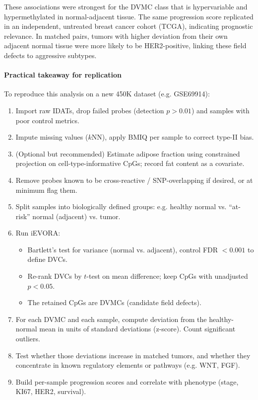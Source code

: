 \documentclass[10pt]{extarticle}
\begin{document}
These associations were strongest for the DVMC class that is hypervariable and hypermethylated in normal-adjacent tissue. The same progression score replicated in an independent, untreated breast cancer cohort (TCGA), indicating prognostic relevance. In matched pairs, tumors with higher deviation from their own adjacent normal tissue were more likely to be HER2-positive, linking these field defects to aggressive subtypes.

\paragraph{Practical takeaway for replication}
To reproduce this analysis on a new 450K dataset (e.g. GSE69914): 
\begin{enumerate}
  \item Import raw IDATs, drop failed probes (detection $p>0.01$) and samples with poor control metrics.
  \item Impute missing values ($k$NN), apply BMIQ per sample to correct type-II bias.
  \item (Optional but recommended) Estimate adipose fraction using constrained projection on cell-type-informative CpGs; record fat content as a covariate.
  \item Remove probes known to be cross-reactive / SNP-overlapping if desired, or at minimum flag them.
  \item Split samples into biologically defined groups: e.g. healthy normal vs. “at-risk” normal (adjacent) vs. tumor.
  \item Run iEVORA: 
    \begin{itemize}[label=-]
      \item Bartlett’s test for variance (normal vs. adjacent), control FDR $<0.001$ to define DVCs.
      \item Re-rank DVCs by $t$-test on mean difference; keep CpGs with unadjusted $p<0.05$.
      \item The retained CpGs are DVMCs (candidate field defects).
    \end{itemize}
  \item For each DVMC and each sample, compute deviation from the healthy-normal mean in units of standard deviations (z-score). Count significant outliers.
  \item Test whether those deviations increase in matched tumors, and whether they concentrate in known regulatory elements or pathways (e.g. WNT, FGF).
  \item Build per-sample progression scores and correlate with phenotype (stage, KI67, HER2, survival). 
\end{enumerate}
\end{document}
